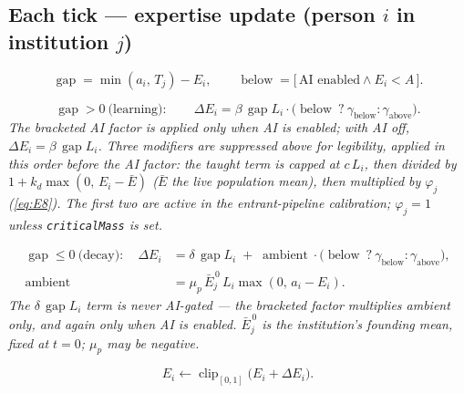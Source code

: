 \documentclass[11pt]{article}
\newcommand{\key}[1]{\texttt{\footnotesize #1}}
\newcommand{\eqn}[1]{\eqref{eq:#1}}
\newcommand{\eqnote}[1]{{\small\itshape #1}\par\addvspace{4pt}}
\begin{document}
\subsection*{Each tick --- expertise update (person $i$ in institution $j$)}

\begin{equation}\label{eq:E9}
  \operatorname{gap} = \min(a_i,\, T_j) - E_i, \qquad
  \operatorname{below} = \bigl[\, \text{AI enabled} \wedge E_i < A \,\bigr].
\end{equation}

\begin{equation}\label{eq:E10}
  \operatorname{gap} > 0 \ \text{(learning)}: \qquad
  \Delta E_i = \beta \, \operatorname{gap} L_i \cdot
    \bigl( \operatorname{below} \ ? \ \gamma_{\text{below}} : \gamma_{\text{above}} \bigr).
\end{equation}
\eqnote{The bracketed AI factor is applied only when AI is enabled; with AI off,
$\Delta E_i = \beta\,\operatorname{gap} L_i$. Three modifiers are suppressed above
for legibility, applied in this order \emph{before} the AI factor: the taught term
is capped at $c\,L_i$, then divided by $1 + k_d \max(0,\, E_i - \bar E)$ ($\bar E$
the live population mean), then multiplied by $\varphi_j$ (\eqn{E8}). The first two
are active in the entrant-pipeline calibration; $\varphi_j = 1$ unless
\key{criticalMass} is set.}

\begin{equation}\label{eq:E11}
  \begin{aligned}
    \operatorname{gap} \le 0 \ \text{(decay)}: \quad
    \Delta E_i &= \delta \, \operatorname{gap} L_i \;+\; \operatorname{ambient} \cdot
      \bigl( \operatorname{below} \ ? \ \gamma_{\text{below}} : \gamma_{\text{above}} \bigr), \\
    \operatorname{ambient} &= \mu_p \, \bar E_j^{\,0} \, L_i \max(0,\, a_i - E_i).
  \end{aligned}
\end{equation}
\eqnote{The $\delta\,\operatorname{gap} L_i$ term is never AI-gated --- the
bracketed factor multiplies \textup{ambient} only, and again only when AI is
enabled. $\bar E_j^{\,0}$ is the institution's \emph{founding} mean, fixed at
$t = 0$; $\mu_p$ may be negative.}

\begin{equation}\label{eq:E12}
  E_i \leftarrow \operatorname{clip}_{[0,1]}\!\bigl(E_i + \Delta E_i\bigr).
\end{equation}
\end{document}
